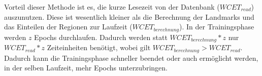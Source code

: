 Vorteil dieser Methode ist es, die kurze Lesezeit von der Datenbank ($WCET_{read}$) auszunutzen. Diese ist wesentlich kleiner als die Berechnung der Landmarks und das Einteilen der Regionen zur Laufzeit ($WCET_{berechnung}$). In der Trainingsphase werden $z$ Epochs durchlaufen. Dadurch werden statt  $WCET_{berechnung} * z$ nur $WCET_{read} * z$ Zeiteinheiten benötigt, wobei gilt $WCET_{berechnung} > WCET_{read}$. Dadurch kann die Trainingsphase schneller beendet oder auch ermöglicht werden, in der selben Laufzeit, mehr Epochs unterzubringen.
































